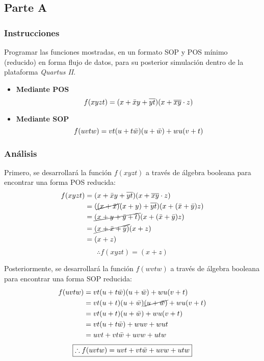 \documentclass[../procedimientos.tex]{subfiles}
\begin{document}
\clearpage
\subsection{Parte A}
\subsubsection{Instrucciones}
\begin{em}
  Programar las funciones mostradas, en un formato SOP y POS mínimo (reducido) 
  en forma flujo de datos, para su posterior simulación dentro de la 
  plataforma \textit{Quartus II}.
  \begin{itemize}
    \item \textbf{Mediante POS}
      \begin{equation*}
        f(xyzt) = (x + \bar{x}y + \overline{yt})(x + \overline{xy}\cdot z)
      \end{equation*}
    \item \textbf{Mediante SOP}
      \begin{equation*}
        f(uvtw) = vt(u+t\bar{w})(u+\bar{w})+wu(v+t)
      \end{equation*}
  \end{itemize}
\end{em}

\subsubsection{Análisis}\label{subs:analisis_a}
Primero, se desarrollará la función $f(xyzt)$ a través de álgebra booleana 
para encontrar una forma POS reducida:
\begin{align*}
  f(xyzt) &= (x + \bar{x}y + \overline{yt})(x + \overline{xy}\cdot z)\\
  &= (\cancel{(x+\bar{x})}(x+y) + \overline{yt})(x + (\bar{x}+\bar{y})z)\\
  &= \cancel{(x+y + \bar{y} + \bar{t})}(x + (\bar{x}+\bar{y})z)\\
  &= \cancel{(x+\bar{x}+\bar{y})}(x+z)\\
  &= (x+z)
\end{align*}
\begin{equation*}
  \boxed{
    \therefore f(xyzt) = (x+z)
  }
\end{equation*}

Posteriormente, se desarrollará la función $f(wvtw)$ a través de álgebra 
booleana para encontrar una forma SOP reducida:
\begin{align*}
  f(uvtw) &= vt(u+t\bar{w})(u+\bar{w})+wu(v+t)\\
  &= vt(u+t)(u+\bar{w})\cancel{(u+\bar{w})}+wu(v+t)\\
  &= vt(u+t)(u+\bar{w})+wu(v+t)\\
  &= vt(u+t\bar{w})+wuv+wut\\
  &= uvt+vt\bar{w}+uvw+utw
\end{align*}
\begin{equation*}
  \boxed{
    \therefore f(uvtw) = uvt+vt\bar{w}+uvw+utw
  }
\end{equation*}
\end{document}
